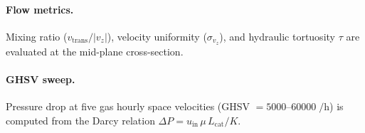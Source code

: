 \paragraph{Flow metrics.}
Mixing ratio ($v_\mathrm{trans}/|v_z|$), velocity uniformity
($\sigma_{v_z}$), and hydraulic tortuosity $\tau$ are evaluated
at the mid-plane cross-section.

\paragraph{GHSV sweep.}
Pressure drop at five gas hourly space velocities
(GHSV $= 5000$--$\num{60000}\;\si{\per\hour}$) is computed
from the Darcy relation $\Delta P = u_\mathrm{in}\,\mu\,L_\mathrm{cat}/K$.
